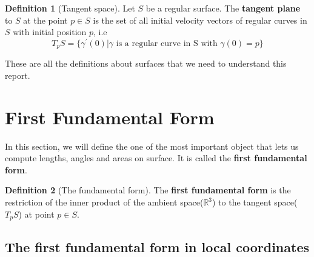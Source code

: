 \documentclass{article}
\theoremstyle{plain}
\theoremstyle{definition}
\newtheorem{definition}{Definition}
\theoremstyle{remark}
\newcommand{\R}{\mathbb{R}}
\begin{document}
\begin{definition}[Tangent space]
    Let \(S\) be a regular surface. The \textbf{tangent plane} to \(S\) at the point \( p \in S\) is the set of all initial velocity vectors of regular curves in \(S\) with initial position \(p\), i.e \[ T_pS = \{ \gamma^\prime(0) | \gamma \text{ is a regular curve in S with }\gamma(0) = p\} \]
\end{definition}

These are all the definitions about surfaces that we need to understand this report.

\section{First Fundamental Form}
In this section, we will define the one of the most important object that lets us compute lengths, angles and areas on surface. It is called the \textbf{first fundamental form}. 

\begin{definition}[The fundamental form]
    The \textbf{first fundamental form} is the restriction of the inner product of the ambient space(\(\R^3\)) to the tangent space(\( T_pS\)) at point \( p \in S\).
\end{definition}

\subsection{The first fundamental form in local coordinates}
\end{document}
